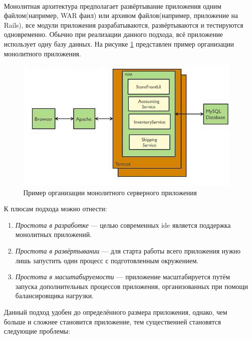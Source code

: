\paragraph {}
Монолитная архитектура предполагает развёртывание приложения одним файлом(например, WAR фаил) или архивом файлов(например, приложение на Rails), все модули приложения разрабатываются, развёртываются и тестируются одновременно. Обычно при реализации данного подхода, всё приложение использует одну базу данных. На рисунке \ref{sec:analysis:research:arch:back:monolith} представлен пример организации монолитного приложения. \cite{microservices:ma}

\begin{figure}[h]
  \centering
    \includegraphics[width=1\textwidth]{inc/img/backend-monolith.jpg}
  \caption{Пример организации монолитного серверного приложения}
  \label{sec:analysis:research:arch:back:monolith}
\end{figure}

К плюсам подхода можно отнести:

\begin{enumerate}
	\item \emph{Простота в разработке} --- целью современных \gls{ide} является поддержка монолитных приложений.
	\item \emph{Простота в развёртывании} --- для старта работы всего приложения нужно лишь запустить один процесс с подготовленным окружением.
	\item \emph{Простота в масштабируемости} --- приложение масштабируется путём запуска дополнительных процессов приложения, организованных при помощи балансировщика нагрузки.
\end{enumerate}

Данный подход удобен до определённого размера приложения, однако, чем больше и сложнее становится приложение, тем существенней становятся следующие проблемы:

